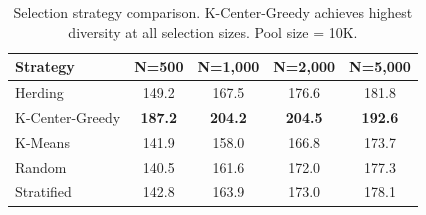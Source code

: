 \begin{table}[t]
\centering
\caption{Selection strategy comparison. K-Center-Greedy achieves highest diversity at all selection sizes. Pool size = 10K.}
\label{tab:selection_strategies}
\small
\begin{tabular}{lcccc}
\toprule
\textbf{Strategy} & \textbf{N=500} & \textbf{N=1,000} & \textbf{N=2,000} & \textbf{N=5,000}  \\
\midrule
Herding & 149.2 & 167.5 & 176.6 & 181.8  \\
K-Center-Greedy & \textbf{187.2} & \textbf{204.2} & \textbf{204.5} & \textbf{192.6}  \\
K-Means & 141.9 & 158.0 & 166.8 & 173.7  \\
Random & 140.5 & 161.6 & 172.0 & 177.3  \\
Stratified & 142.8 & 163.9 & 173.0 & 178.1  \\
\bottomrule
\end{tabular}
\end{table}
